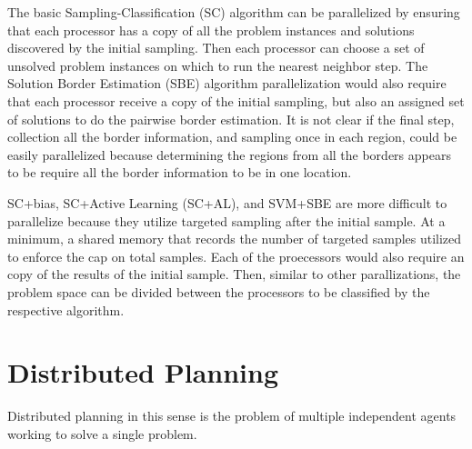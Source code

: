 The basic Sampling-Classification (SC) algorithm can be parallelized by ensuring that each processor has a copy of all the problem instances and solutions discovered by the initial sampling.  Then each processor can choose a set of unsolved problem instances on which to run the nearest neighbor step.  The Solution Border Estimation (SBE) algorithm parallelization would also require that each processor receive a copy of the initial sampling, but also an assigned set of solutions to do the pairwise border estimation.  It is not clear if the final step, collection all the border information, and sampling once in each region, could be easily parallelized because determining the regions from all the borders appears to be require all the border information to be in one location.

SC+bias, SC+Active Learning (SC+AL), and SVM+SBE are more difficult to parallelize because they utilize targeted sampling after the initial sample.  At a minimum, a shared memory that records the number of targeted samples utilized to enforce the cap on total samples.  Each of the proecessors would also require an copy of the results of the initial sample. Then, similar to other parallizations, the problem space can be divided between the processors to be classified by the respective algorithm.





\section{Distributed Planning}

Distributed planning in this sense is the problem of  multiple independent agents working to solve a single problem. 


